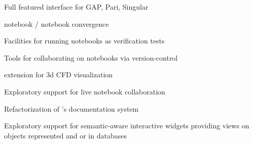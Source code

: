 \begin{workpackage}
\begin{wpdelivs}
  \begin{wpdeliv}[due=12,id=ipython-kernels,dissem=PU,nature=O]
      {Full featured \Jupyter interface for GAP, Pari, Singular}
  \end{wpdeliv}
  
  \begin{wpdeliv}[due=12,id=ipython-kernel-sage,dissem=PU,nature=DEM]
      {\Sage notebook / \Jupyter notebook convergence}
  \end{wpdeliv}

  \begin{wpdeliv}[due=18,id=jupyter-test,dissem=PU,nature=O]
      {Facilities for running notebooks as verification tests}
  \end{wpdeliv}
  
  \begin{wpdeliv}[due=12,id=jupyter-collab,dissem=PU,nature=O]
      {Tools for collaborating on notebooks via version-control}
  \end{wpdeliv}

  \begin{wpdeliv}[due=24,id=cfd-vis,dissem=PU,nature=O]
      {\Jupyter extension for 3d CFD visualization}
  \end{wpdeliv}


  \begin{wpdeliv}[due=36,id=jupyter-live-collab,dissem=PU,nature=O]
      {Exploratory support for live notebook collaboration}
  \end{wpdeliv}

  \begin{wpdeliv}[due=24,id=sage-sphinx,dissem=PU,nature=O]
      {Refactorization of \Sage's \Sphinx documentation system}
  \end{wpdeliv}

  \begin{wpdeliv}[due=36,id=ipython-advanced-interacts,dissem=PU,nature=DEM]
      {Exploratory support for semantic-aware interactive widgets providing views on objects
      represented and or in databases}
  \end{wpdeliv}




\end{wpdelivs}
\end{workpackage}
